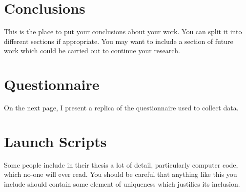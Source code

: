 \documentclass[12pt,a4paper]{report}
\begin{document}










\chapter{Conclusions}

This is the place to put your conclusions about your work. You can
split it into different sections if appropriate. You may want to include
a section of future work which could be carried out to continue your
research.

\appendix

\chapter{Questionnaire}\label{app:quest}
On the next page, I present a replica of the questionnaire used to collect data.



\chapter{Launch Scripts}\label{app:launch}

Some people include in their thesis a lot of detail, particularly
computer code, which no-one will ever read. You should be careful that
anything like this you include should contain some element of uniqueness
which justifies its inclusion.



\end{document}
